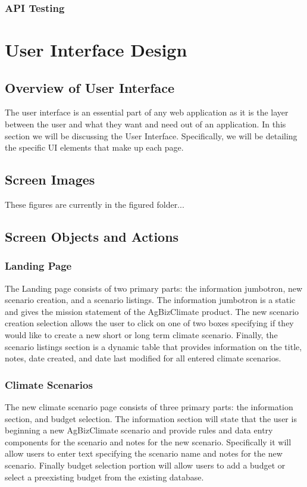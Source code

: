 \documentclass[onecolumn, draftclsnofoot,10pt, compsoc]{article}
\begin{document}
		\subsubsection{API Testing}

\section{User Interface Design}

	\subsection{Overview of User Interface}
	The user interface is an essential part of any web application as it is the layer between the user and what they want and need out of an application. In this section we will be discussing the User Interface. Specifically, we will be detailing the specific UI elements that make up each page.
	\subsection{Screen Images}
	These figures are currently in the figured folder...
	\subsection{Screen Objects and Actions}
		\subsubsection{Landing Page}
		The Landing page consists of two primary parts: the information jumbotron, new scenario creation, and a scenario listings. The information jumbotron is a static and gives the mission statement of the AgBizClimate product. The new scenario creation selection allows the user to click on one of two boxes specifying if they would like to create a new short or long term climate scenario. Finally, the scenario listings section is a dynamic table that provides information on the title, notes, date created, and date last modified for all entered climate scenarios.\\
		\subsubsection{Climate Scenarios}
		The new climate scenario page consists of three primary parts: the information section, and budget selection. The information section will state that the user is beginning a new AgBizClimate scenario and provide rules and data entry components for the scenario and notes for the new scenario. Specifically it will allow users to enter text specifying the scenario name and notes for the new scenario. Finally budget selection portion will allow users to add a budget or select a preexisting budget from the existing database.
\end{document}
